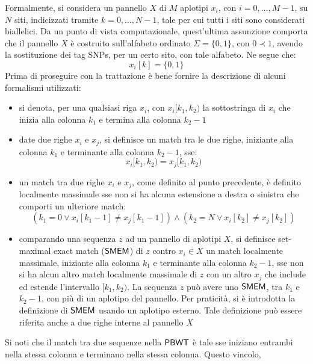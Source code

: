 Formalmente, si considera un pannello $X$ di $M$ aplotipi $x_i$, con
$i=0,\ldots, M-1$, su $N$ siti, indicizzati tramite $k=0,\ldots, N-1$, tale per
cui tutti i siti sono considerati biallelici. 
Da un punto di vista computazionale, quest'ultima
assunzione comporta che il pannello $X$ è costruito sull'alfabeto ordinato
$\Sigma =\{0,1\}$, con $0\prec 1$, avendo la sostituzione dei tag SNPs,
per un certo sito, con tale alfabeto. Ne segue che:
\begin{equation}
  \label{eq:pbwtdip}
  x_i[k]=\{0,1\}
\end{equation}
Prima di proseguire con la trattazione è bene fornire la descrizione di alcuni
formalismi utilizzati:
\begin{itemize}
  \item si denota, per una qualsiasi riga $x_i$, con $x_i[k_1,k_2)$ la
  sottostringa di $x_i$ che inizia alla colonna $k_1$ e termina alla
  colonna $k_2-1$
  \item date due righe $x_i$ e $x_j$, si definisce un match tra le due
  righe, iniziante
  alla colonna $k_1$ e terminante alla colonna $k_2-1$, sse:
  \begin{equation}
    \label{eq:pbwtmatch}
    x_i[k_1,k_2)=x_j[k_1,k_2)
  \end{equation}
  \item un match tra due righe $x_i$ e $x_j$, come definito al punto precedente,
  è definito localmente massimale sse non si ha alcuna estensione a
  destra o sinistra che comporti un ulteriore match:
  \begin{equation}
    \label{eq:pbwtmem}
    (k_1=0\lor x_i[k_1-1]\neq x_j[k_1-1])\land (k_2=N\lor x_i[k_2]\neq x_j[k_2])
  \end{equation}
  \item comparando una sequenza $z$ ad un pannello di aplotipi $X$, si definisce
  set-maximal exact match ($\mbox{\rm {\sf SMEM}}$) di $z$ contro $x_i\in X$ un match
  localmente massimale, iniziante 
  alla colonna $k_1$ e terminante alla colonna $k_2-1$,
  sse non si ha alcun altro match localmente
  massimale di $z$ con un 
  altro $x_j$ che include ed estende l'intervallo $[k_1,k_2)$. La sequenza $z$
  può avere uno $\mbox{\rm {\sf SMEM}}$, tra $k_1$ e $k_2-1$, con più di un aplotipo del
  pannello. Per praticità, si è introdotta la definizione di $\mbox{\rm {\sf SMEM}}$ usando un
  aplotipo esterno. Tale definizione può essere riferita anche a due righe
  interne al pannello $X$
\end{itemize}
Si noti che il match tra due sequenze nella $\mbox{\rm {\sf PBWT}}$ è tale sse iniziano
entrambi nella stessa colonna e terminano nella stessa colonna. Questo vincolo,
